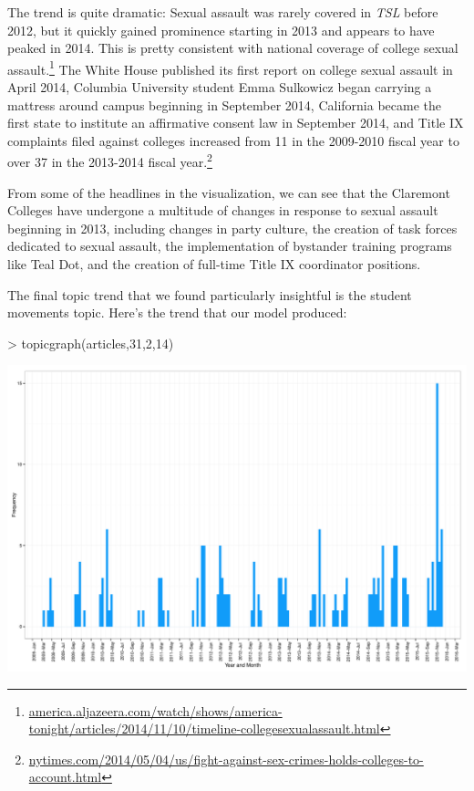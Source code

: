 \documentclass[a4paper]{article}
\begin{document}
The trend is quite dramatic: Sexual assault was rarely covered in \textit{TSL} before 2012, but it quickly gained prominence starting in 2013 and appears to have peaked in 2014. This is pretty consistent with national coverage of college sexual assault.\footnote{\href{http://america.aljazeera.com/watch/shows/america-tonight/articles/2014/11/10/timeline-collegesexualassault.html}{america.aljazeera.com/watch/shows/america-tonight/articles/2014/11/10/timeline-collegesexualassault.html}} The White House published its first report on college sexual assault in April 2014, Columbia University student Emma Sulkowicz began carrying a mattress around campus beginning in September 2014, California became the first state to institute an affirmative consent law in September 2014, and Title IX complaints filed against colleges increased from 11 in the 2009-2010 fiscal year to over 37 in the 2013-2014 fiscal year.\footnote{\href{http://www.nytimes.com/2014/05/04/us/fight-against-sex-crimes-holds-colleges-to-account.html}{nytimes.com/2014/05/04/us/fight-against-sex-crimes-holds-colleges-to-account.html}}

From some of the headlines in the visualization, we can see that the Claremont Colleges have undergone a multitude of changes in response to sexual assault beginning in 2013, including changes in party culture, the creation of task forces dedicated to sexual assault, the implementation of bystander training programs like Teal Dot, and the creation of full-time Title IX coordinator positions.

The final topic trend that we found particularly insightful is the student movements topic. Here's the trend that our model produced:

\begin{Schunk}
\begin{Sinput}
> topicgraph(articles,31,2,14)
\end{Sinput}
\end{Schunk}
\includegraphics{FinalProject-009}
\end{document}
